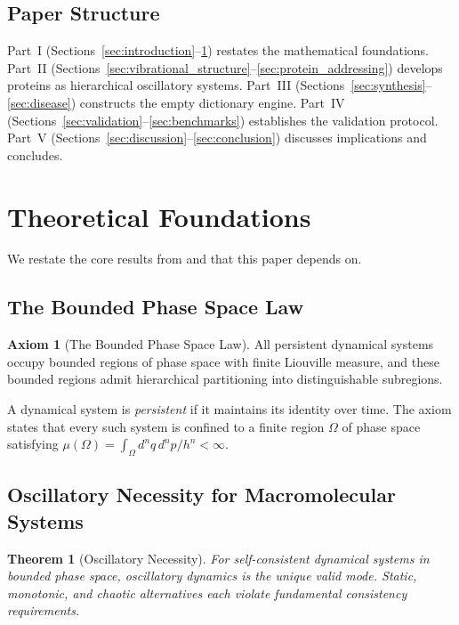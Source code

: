 \documentclass[11pt,twocolumn,a4paper]{article}
\newtheorem{theorem}{Theorem}[section]
\theoremstyle{definition}
\newtheorem{axiom}{Axiom}
\theoremstyle{remark}
\begin{document}
\subsection{Paper Structure}

Part~I (Sections~\ref{sec:introduction}--\ref{sec:foundations}) restates the mathematical foundations. Part~II (Sections~\ref{sec:vibrational_structure}--\ref{sec:protein_addressing}) develops proteins as hierarchical oscillatory systems. Part~III (Sections~\ref{sec:synthesis}--\ref{sec:disease}) constructs the empty dictionary engine. Part~IV (Sections~\ref{sec:validation}--\ref{sec:benchmarks}) establishes the validation protocol. Part~V (Sections~\ref{sec:discussion}--\ref{sec:conclusion}) discusses implications and concludes.

\section{Theoretical Foundations}
\label{sec:foundations}

We restate the core results from \citet{sachikonye2025a} and \citet{sachikonye2025b} that this paper depends on.

\subsection{The Bounded Phase Space Law}

\begin{axiom}[The Bounded Phase Space Law]
\label{ax:bpsl}
All persistent dynamical systems occupy bounded regions of phase space with finite Liouville measure, and these bounded regions admit hierarchical partitioning into distinguishable subregions.
\end{axiom}

A dynamical system is \emph{persistent} if it maintains its identity over time. The axiom states that every such system is confined to a finite region $\Omega$ of phase space satisfying $\mu(\Omega) = \int_\Omega d^n q \, d^n p / h^n < \infty$.

\subsection{Oscillatory Necessity for Macromolecular Systems}

\begin{theorem}[Oscillatory Necessity]
\label{thm:oscillatory}
For self-consistent dynamical systems in bounded phase space, oscillatory dynamics is the unique valid mode. Static, monotonic, and chaotic alternatives each violate fundamental consistency requirements.
\end{theorem}
\end{document}
